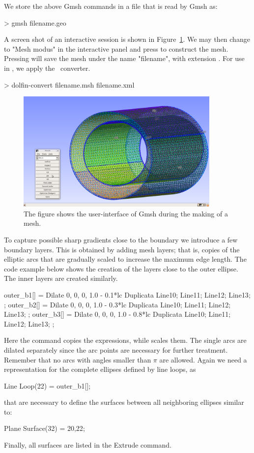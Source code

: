 We store the above Gmsh commands in a  file that is read by Gmsh as:
\begin{bash}
> gmsh filename.geo
\end{bash}
A screen shot of an interactive session is shown in
Figure~\ref{fig:Gmsh_mesh}.  We may then change to "Mesh modus" in the
interactive panel and press  to construct the
mesh. Pressing  will save the mesh under the name
"filename", with extension . For use in \dolfin, we apply
the \dolfin\ converter.

\begin{bash}
> dolfin-convert filename.msh filename.xml
\end{bash}

\begin{figure}
\center\includegraphics[width=100mm]{chapters/hentschel/pdf/gmsh.pdf}
\caption{The figure shows the user-interface of Gmsh during the making
of a mesh.}
\label{fig:Gmsh_mesh}
\end{figure}

To capture possible sharp gradients close to the boundary we introduce
a few boundary layers.  This is obtained by adding mesh layers; that
is, copies of the elliptic arcs that are gradually scaled to increase
the maximum edge length. The code example below shows the creation of
the layers close to the outer ellipse. The inner layers are created
similarly.
\begin{anycode}
outer_b1[] = Dilate {{0, 0, 0}, 1.0 - 0.1*lc } {
Duplicata{  Line{10}; Line{11}; Line{12}; Line{13}; } };
outer_b2[] = Dilate {{0, 0, 0}, 1.0 - 0.3*lc } {
Duplicata{  Line{10}; Line{11}; Line{12}; Line{13}; } };
outer_b3[] = Dilate {{0, 0, 0}, 1.0 - 0.8*lc } {
Duplicata{  Line{10}; Line{11}; Line{12}; Line{13}; } };
\end{anycode}
Here the command  copies the expressions, while  scales them.
The single arcs are dilated separately since the arc points are necessary for further treatment. Remember that no arcs with angles smaller than $\pi$ are allowed. Again we need a representation for the complete ellipses defined by line loops, as
\begin{anycode}
Line Loop(22) = {outer_b1[]};
\end{anycode}
that are necessary to define the surfaces between all neighboring ellipses similar to:
\begin{anycode}
Plane Surface(32) = {20,22};
\end{anycode}
Finally, all surfaces are listed in the Extrude command.

